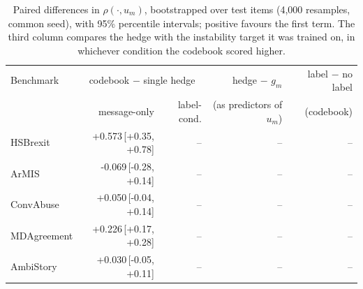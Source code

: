 \begin{table}[t]
\centering
\small
\begin{tabular}{lrrrr}
\hline
Benchmark & \multicolumn{2}{c}{codebook $-$ single hedge} & hedge $-$ $g_m$ & label $-$ no label \\
 & message-only & label-cond. & (as predictors of $u_m$) & (codebook) \\
\hline
HSBrexit & +0.573{\scriptsize\,[+0.35, +0.78]} & -- & -- & -- \\
ArMIS & -0.069{\scriptsize\,[-0.28, +0.14]} & -- & -- & -- \\
ConvAbuse & +0.050{\scriptsize\,[-0.04, +0.14]} & -- & -- & -- \\
MDAgreement & +0.226{\scriptsize\,[+0.17, +0.28]} & -- & -- & -- \\
AmbiStory & +0.030{\scriptsize\,[-0.05, +0.11]} & -- & -- & -- \\
\hline
\end{tabular}
\caption{Paired differences in $\rho(\cdot,u_m)$, bootstrapped over test items (4,000 resamples, common seed), with 95\% percentile intervals; positive favours the first term. The third column compares the hedge with the instability target it was trained on, in whichever condition the codebook scored higher.}
\label{tab:paired}
\end{table}